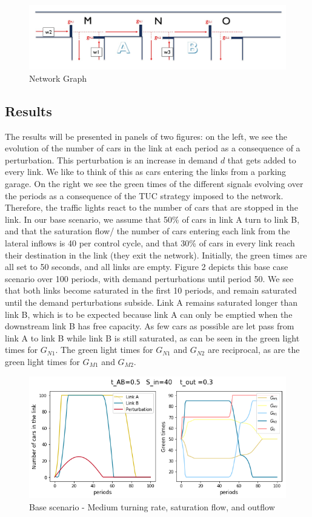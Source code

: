 \documentclass[11pt]{article}
\begin{document}
\begin{figure}[h!]
    \caption{Network Graph}
      \centering
	\includegraphics[width=18cm]{network-graph}
\end{figure}

\subsection{Results}

The results will be presented in panels of two figures: on the left, we see the evolution of the number of cars in the link at each period as a consequence of a perturbation. This perturbation is an increase in demand $d$ that gets added to every link. We like to think of this as cars entering the links from a parking garage. 
On the right we see the green times of the different signals evolving over the periods as a consequence of the TUC strategy imposed to the network. Therefore, the traffic lights react to the number of cars that are stopped in the link. In our base scenario, we assume that 50\% of cars in link A turn to link B, and that the saturation flow/ the number of cars entering each link from the lateral inflows is 40 per control cycle, and that 30\% of cars in every link reach their destination in the link (they exit the network). Initially, the green times are all set to 50 seconds, and all links are empty. Figure 2 depicts this base case scenario over 100 periods, with demand perturbations until period 50. We see that both links become saturated in the first 10 periods, and remain saturated until the demand perturbations subside. Link A remains saturated longer than link B, which is to be expected because link A can only be emptied when the downstream link B has free capacity. As few cars as possible are let pass from link A to link B while link B is still saturated, as can be seen in the green light times for $G_{N1}$. The green light times for  $G_{N1}$ and  $G_{N2}$ are reciprocal, as are the green light times for $G_{M1}$ and  $G_{M2}$. 

\begin{figure}[h!]
    \caption{Base scenario - Medium turning rate, saturation flow, and outflow}
      \centering
	\includegraphics[width=13cm]{sim4}
\end{figure}
\end{document}
